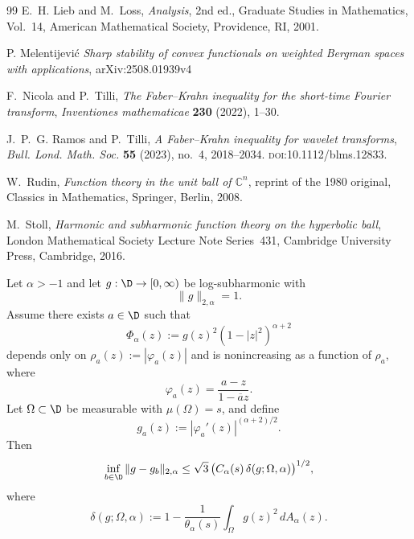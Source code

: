 \begin{thebibliography}{99}
E.~H. Lieb and M.~Loss, \emph{Analysis}, 2nd ed., Graduate Studies in Mathematics, Vol.~14, American Mathematical Society, Providence, RI, 2001.

P. Melentijevi\'c \emph{Sharp stability of convex functionals on weighted Bergman spaces with applications},  arXiv:2508.01939v4


F.~Nicola and P.~Tilli, \emph{The Faber--Krahn inequality for the short-time Fourier transform}, \emph{Inventiones mathematicae} \textbf{230} (2022), 1--30.

J.~P.~G. Ramos and P.~Tilli, \emph{A Faber--Krahn inequality for wavelet transforms}, \emph{Bull. Lond. Math. Soc.} \textbf{55} (2023), no.~4, 2018--2034. \textsc{doi}:10.1112/blms.12833.


W.~Rudin, \emph{Function theory in the unit ball of $\mathbb{C}^n$}, reprint of the 1980 original, Classics in Mathematics, Springer, Berlin, 2008.

M.~Stoll, \emph{Harmonic and subharmonic function theory on the hyperbolic ball}, London Mathematical Society Lecture Note Series~431, Cambridge University Press, Cambridge, 2016.

\end{thebibliography}





\begin{numcor}
\label{cor:mobius_transfer}
Let $\alpha>-1$ and let $g:\D\to[0,\infty)$ be log-subharmonic with
\[
\|g\|_{2,\alpha}=1.
\]
Assume there exists $a\in\D$ such that
\[
\Phi_\alpha(z):=g(z)^2(1-|z|^2)^{\alpha+2}
\]
depends only on $\rho_a(z):=|\varphi_a(z)|$ and is nonincreasing as a function of $\rho_a$,
where
\[
\varphi_a(z)=\frac{a-z}{1-\overline a z}.
\]
Let $\Omega\subset\D$ be measurable with $\mu(\Omega)=s$, and define
\[
g_a(z):=|\varphi_a'(z)|^{(\alpha+2)/2}.
\]
Then
\[
\inf_{b\in\D}\|g-g_b\|_{2,\alpha}
\le \sqrt{3}\,\bigl(C_\alpha(s)\,\delta(g;\Omega,\alpha)\bigr)^{1/2},
\]
where
\[
\delta(g;\Omega,\alpha)
:=1-\frac{1}{\theta_\alpha(s)}\int_\Omega g(z)^2\,dA_\alpha(z).
\]
\end{numcor}

